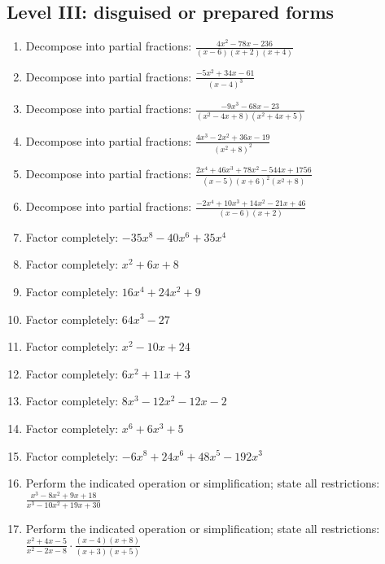 \documentclass[11pt,oneside]{book}
\begin{document}
\subsection*{Level III: disguised or prepared forms}
\begin{enumerate}[leftmargin=*,label=\textbf{\arabic*.},itemsep=0.65\baselineskip]
\item Decompose into partial fractions: $\displaystyle \frac{4 x^{2} - 78 x - 236}{\left(x - 6\right) \left(x + 2\right) \left(x + 4\right)}$
\item Decompose into partial fractions: $\displaystyle \frac{- 5 x^{2} + 34 x - 61}{\left(x - 4\right)^{3}}$
\item Decompose into partial fractions: $\displaystyle \frac{- 9 x^{3} - 68 x - 23}{\left(x^{2} - 4 x + 8\right) \left(x^{2} + 4 x + 5\right)}$
\item Decompose into partial fractions: $\displaystyle \frac{4 x^{3} - 2 x^{2} + 36 x - 19}{\left(x^{2} + 8\right)^{2}}$
\item Decompose into partial fractions: $\displaystyle \frac{2 x^{4} + 46 x^{3} + 78 x^{2} - 544 x + 1756}{\left(x - 5\right) \left(x + 6\right)^{2} \left(x^{2} + 8\right)}$
\item Decompose into partial fractions: $\displaystyle \frac{- 2 x^{4} + 10 x^{3} + 14 x^{2} - 21 x + 46}{\left(x - 6\right) \left(x + 2\right)}$
\item Factor completely: $ - 35 x^{8} - 40 x^{6} + 35 x^{4} $
\item Factor completely: $ x^{2} + 6 x + 8 $
\item Factor completely: $ 16 x^{4} + 24 x^{2} + 9 $
\item Factor completely: $ 64 x^{3} - 27 $
\item Factor completely: $ x^{2} - 10 x + 24 $
\item Factor completely: $ 6 x^{2} + 11 x + 3 $
\item Factor completely: $ 8 x^{3} - 12 x^{2} - 12 x - 2 $
\item Factor completely: $ x^{6} + 6 x^{3} + 5 $
\item Factor completely: $ - 6 x^{8} + 24 x^{6} + 48 x^{5} - 192 x^{3} $
\item Perform the indicated operation or simplification; state all restrictions: $\displaystyle \frac{x^{3} - 8 x^{2} + 9 x + 18}{x^{3} - 10 x^{2} + 19 x + 30}$
\item Perform the indicated operation or simplification; state all restrictions: $\displaystyle \frac{x^{2} + 4 x - 5}{x^{2} - 2 x - 8}\cdot\frac{\left(x - 4\right) \left(x + 8\right)}{\left(x + 3\right) \left(x + 5\right)}$

\end{enumerate}
\end{document}

